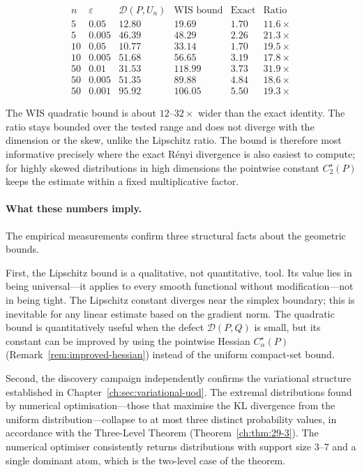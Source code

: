\[
\begin{array}{c|c|c|c|c|c}
n & \varepsilon & \mathcal D(P,U_n) & \text{WIS bound} & \text{Exact} & \text{Ratio} \\ \hline
5 & 0.05 & 12.80 & 19.69 & 1.70 & 11.6\times \\
5 & 0.005 & 46.39 & 48.29 & 2.26 & 21.3\times \\
10 & 0.05 & 10.77 & 33.14 & 1.70 & 19.5\times \\
10 & 0.005 & 51.68 & 56.65 & 3.19 & 17.8\times \\
50 & 0.01 & 31.53 & 118.99 & 3.73 & 31.9\times \\
50 & 0.005 & 51.35 & 89.88 & 4.84 & 18.6\times \\
50 & 0.001 & 95.92 & 106.05 & 5.50 & 19.3\times
\end{array}
\]

The WIS quadratic bound is about $12$--$32\times$ wider than the exact
identity.  The ratio stays bounded over the tested range and does not
diverge with the dimension or the skew, unlike the Lipschitz ratio.
The bound is therefore most informative precisely
where the exact R\'enyi divergence is also easiest to compute; for
highly skewed distributions in high dimensions the pointwise constant
$C_2^\star(P)$ keeps the estimate within a fixed multiplicative factor.

\paragraph{What these numbers imply.}
The empirical measurements confirm three structural facts about the
geometric bounds.

First, the Lipschitz bound is a qualitative, not quantitative, tool.
Its value lies in being universal---it applies to every smooth
functional without modification---not in being tight.  The Lipschitz
constant diverges near the simplex boundary; this is inevitable for any
linear estimate based on the gradient norm.  The quadratic bound is
quantitatively useful when the defect $\mathcal D(P,Q)$ is small, but
its constant can be improved by using the pointwise Hessian
$C_\alpha^\star(P)$ (Remark~\ref{rem:improved-hessian}) instead of the
uniform compact-set bound.

Second, the discovery campaign independently confirms the variational
structure established in Chapter~\ref{ch:sec:variational-uod}.  The extremal distributions found
by numerical optimisation---those that maximise the KL divergence from
the uniform distribution---collapse to at most three distinct
probability values, in accordance with the Three-Level Theorem
(Theorem~\ref{ch:thm:29-3}).  The numerical optimiser consistently returns
distributions with support size $3$--$7$ and a single dominant atom,
which is the two-level case of the theorem.

